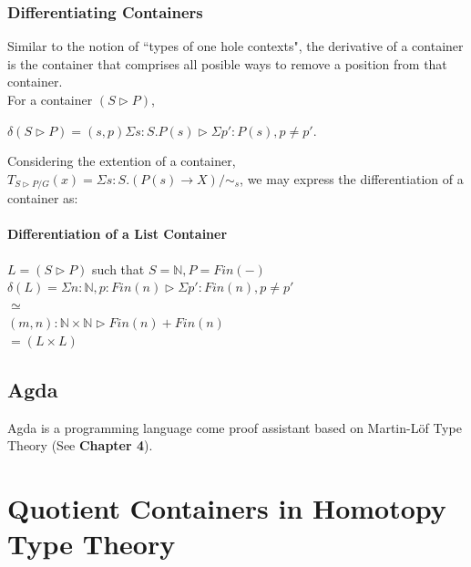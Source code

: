 \documentclass[12pt]{report}
\begin{document}
\section{Differentiating Containers}
Similar to the notion of ``types of one hole contexts", the derivative of a container is the container that comprises all posible ways to remove a position from that container.\\
For a container $(S \rhd P)$,
\begin{center}
$\delta (S \rhd P) = (s,p) \Sigma s : S . P(s) \rhd \Sigma p':P(s),p \neq p'$.
\end{center}
Considering the extention of a container, $T_{S \rhd P/G}(x) = \Sigma s:S.(P(s) \rightarrow X)/\sim_{s}$, we may express the differentiation of a container as:
\begin{center}

\end{center}


\subsection{Differentiation of a List Container}
\begin{center}
$L = (S \rhd P)$ such that $S = \mathbb{N}, P = Fin(-)$\\
$\delta(L) = \Sigma n : \mathbb{N}, p: Fin(n) \rhd \Sigma p' : Fin(n), p \neq p'$\\
$\simeq $\\
$(m,n): \mathbb{N} \times \mathbb{N} \rhd Fin(n) + Fin(n)$\\
$= (L \times L)$\\
\end{center} 


\chapter{Agda}
Agda is a programming language come proof assistant based on Martin-L\"of Type Theory (See \textbf{Chapter 4}).







\part{Quotient Containers in Homotopy Type Theory}
\end{document}
